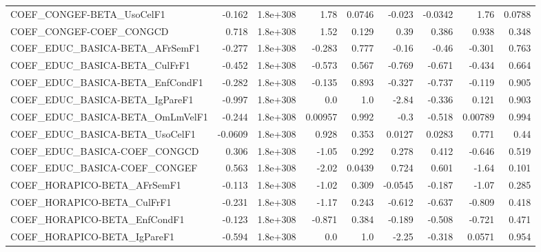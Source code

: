 \begin{tabular}{lrrrrrrrr}
COEF\_CONGEF-BETA\_UsoCelF1             &      -0.162 &     1.8e+308 &     1.78 &   0.0746 &     -0.023 &     -0.0342 &         1.76 &        0.0788 \\
COEF\_CONGEF-COEF\_CONGCD               &       0.718 &     1.8e+308 &     1.52 &    0.129 &       0.39 &       0.386 &        0.938 &         0.348 \\
COEF\_EDUC\_BASICA-BETA\_AFrSemF1        &      -0.277 &     1.8e+308 &   -0.283 &    0.777 &      -0.16 &       -0.46 &       -0.301 &         0.763 \\
COEF\_EDUC\_BASICA-BETA\_CulFrF1         &      -0.452 &     1.8e+308 &   -0.573 &    0.567 &     -0.769 &      -0.671 &       -0.434 &         0.664 \\
COEF\_EDUC\_BASICA-BETA\_EnfCondF1       &      -0.282 &     1.8e+308 &   -0.135 &    0.893 &     -0.327 &      -0.737 &       -0.119 &         0.905 \\
COEF\_EDUC\_BASICA-BETA\_IgPareF1        &      -0.997 &     1.8e+308 &      0.0 &      1.0 &      -2.84 &      -0.336 &        0.121 &         0.903 \\
COEF\_EDUC\_BASICA-BETA\_OmLmVelF1       &      -0.244 &     1.8e+308 &  0.00957 &    0.992 &       -0.3 &      -0.518 &      0.00789 &         0.994 \\
COEF\_EDUC\_BASICA-BETA\_UsoCelF1        &     -0.0609 &     1.8e+308 &    0.928 &    0.353 &     0.0127 &      0.0283 &        0.771 &          0.44 \\
COEF\_EDUC\_BASICA-COEF\_CONGCD          &       0.306 &     1.8e+308 &    -1.05 &    0.292 &      0.278 &       0.412 &       -0.646 &         0.519 \\
COEF\_EDUC\_BASICA-COEF\_CONGEF          &       0.563 &     1.8e+308 &    -2.02 &   0.0439 &      0.724 &       0.601 &        -1.64 &         0.101 \\
COEF\_HORAPICO-BETA\_AFrSemF1           &      -0.113 &     1.8e+308 &    -1.02 &    0.309 &    -0.0545 &      -0.187 &        -1.07 &         0.285 \\
COEF\_HORAPICO-BETA\_CulFrF1            &      -0.231 &     1.8e+308 &    -1.17 &    0.243 &     -0.612 &      -0.637 &       -0.809 &         0.418 \\
COEF\_HORAPICO-BETA\_EnfCondF1          &      -0.123 &     1.8e+308 &   -0.871 &    0.384 &     -0.189 &      -0.508 &       -0.721 &         0.471 \\
COEF\_HORAPICO-BETA\_IgPareF1           &      -0.594 &     1.8e+308 &      0.0 &      1.0 &      -2.25 &      -0.318 &       0.0571 &         0.954 \\

\end{tabular}
